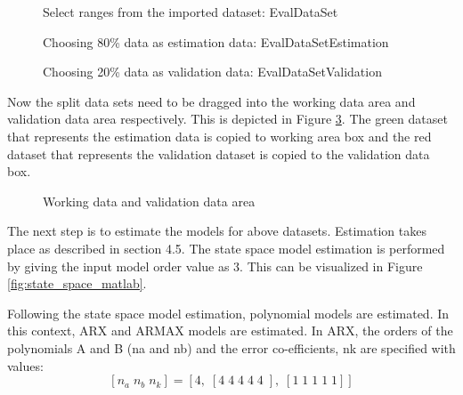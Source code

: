 \documentclass[article,type=msc,colorback,12pt,accentcolor=tud8b,table]{tudthesis}
\begin{document}
\begin{figure}[H]
	\begin{center}
		\makebox[\textwidth]{\texttt{[image: E7]}}
	\end{center}
	\caption{Select ranges from the imported dataset: EvalDataSet}
		\label{fig:select_range_estimation_validation}
\end{figure}


  \begin{figure}[H]
	  	  	  	\begin{center}
	  	  	  		\makebox[\textwidth]{\texttt{[image: E8]}}
	  	  	  	\end{center}
	  	  	  	\caption{Choosing 80\% data as estimation data: EvalDataSetEstimation}
					\label{fig:80_estimation}
    	\begin{center}
    		\makebox[\textwidth]{\texttt{[image: E9]}}
    	\end{center}
    	\caption{Choosing 20\% data as validation data: EvalDataSetValidation}
    	\label{fig:20_validation}
    \end{figure}	
	
	Now the split data sets need to be dragged into the working data area and validation data area respectively. This is depicted in Figure \ref{fig:working_validation_area}. The green dataset that represents the estimation data is copied to working area box and the red dataset that represents the validation dataset is copied to the validation data box.
	
	    \begin{figure}[H]
	    	\begin{center}
	    		\makebox[\textwidth]{\texttt{[image: E10]}}
	    	\end{center}
	    	\caption{Working data and validation data area}
	    		\label{fig:working_validation_area}
	    \end{figure}
	
	The next step is to estimate the models for above datasets. Estimation takes place as described in section 4.5. The state space model estimation is performed by giving the input model order value as 3. This can be visualized in Figure \ref{fig:state_space_matlab}.
	
	Following the state space model estimation, polynomial models are estimated. In this context, ARX and ARMAX models are estimated. In ARX, the orders of the polynomials A and B (na and nb) and the error co-efficients, nk are specified with values: $$ [n_a\;n_b \;n_k] = [ 4,\; [ 4\; 4\; 4\; 4\; 4\; ],\; [ 1 \;1 \;1 \;1 \;1 ] ]$$
	
\end{document}
